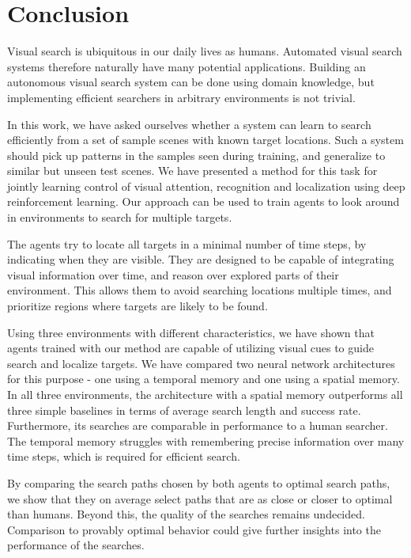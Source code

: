 \chapter{Conclusion}
\label{cha:conclusion}

Visual search is ubiquitous in our daily lives as humans.
Automated visual search systems therefore naturally have many potential applications.
Building an autonomous visual search system can be done using domain knowledge, but implementing efficient searchers in arbitrary environments is not trivial.

In this work, we have asked ourselves whether a system can learn to search efficiently from a set of sample scenes with known target locations.
Such a system should pick up patterns in the samples seen during training, and generalize to similar but unseen test scenes.
We have presented a method for this task for jointly learning control of visual attention, recognition and localization using deep reinforcement learning.
Our approach can be used to train agents to look around in environments to search for multiple targets.

The agents try to locate all targets in a minimal number of time steps, by indicating when they are visible.
They are designed to be capable of integrating visual information over time, and reason over explored parts of their environment.
This allows them to avoid searching locations multiple times, and prioritize regions where targets are likely to be found.

Using three environments with different characteristics, we have shown that agents trained with our method are capable of utilizing visual cues to guide search and localize targets.
We have compared two neural network architectures for this purpose - one using a temporal memory and one using a spatial memory.
In all three environments, the architecture with a spatial memory outperforms all three simple baselines in terms of average search length and success rate.
Furthermore, its searches are comparable in performance to a human searcher.
The temporal memory struggles with remembering precise information over many time steps, which is required for efficient search.

By comparing the search paths chosen by both agents to optimal search paths, we show that they on average select paths that are as close or closer to optimal than humans.
Beyond this, the quality of the searches remains undecided.
Comparison to provably optimal behavior could give further insights into the performance of the searches.

